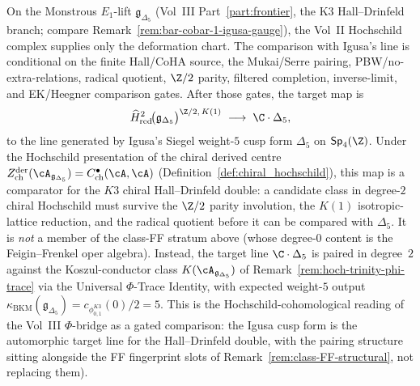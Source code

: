 \begin{remark}
\label{rem:hoch-igusa-gauge-class}
%
%
On the Monstrous $E_1$-lift
$\mathfrak{g}_{\Delta_5}$ (Vol~III Part~\ref{part:frontier},
the K3 Hall--Drinfeld branch; compare
Remark~\ref{rem:bar-cobar-1-igusa-gauge}), the Vol~II Hochschild
complex supplies only the deformation chart. The comparison with
Igusa's line is conditional on the finite Hall/CoHA source, the
Mukai/Serre pairing, PBW/no-extra-relations, radical quotient,
$\Z/2$ parity, filtered completion, inverse-limit, and EK/Heegner
comparison gates. After those gates, the target map is
\[
\widehat H^2_{\mathrm{red}}\!
  \bigl(\mathfrak{g}_{\Delta_5}\bigr)^{\Z/2,\,K(1)}
\;\longrightarrow\;
\C\cdot\Delta_5,
\]
to the line generated by Igusa's Siegel weight-$5$ cusp form
$\Delta_5$ on $\mathsf{Sp}_4(\Z)$. Under the Hochschild presentation
of the chiral derived centre
$Z^{\mathrm{der}}_{\mathrm{ch}}(\cA_{\mathfrak{g}_{\Delta_5}})
=C^\bullet_{\mathrm{ch}}(\cA,\cA)$
(Definition~\ref{def:chiral_hochschild}), this map is a comparator for
the $K3$ chiral Hall--Drinfeld double: a candidate class in
degree-$2$ chiral Hochschild must survive the $\Z/2$ parity involution,
the $K(1)$ isotropic-lattice reduction, and the radical quotient before
it can be compared with $\Delta_5$. It is \emph{not} a member of the
class-FF stratum above (whose degree-$0$ content is the
Feigin--Frenkel oper algebra). Instead, the target line
$\C\cdot\Delta_5$ is paired in degree~$2$ against the
Koszul-conductor class
$K(\cA_{\mathfrak{g}_{\Delta_5}})$ of
Remark~\ref{rem:hoch-trinity-phi-trace} via the Universal
$\Phi$-Trace Identity, with expected weight-$5$ output
$\kappa_{\mathrm{BKM}}(\mathfrak{g}_{\Delta_5})=c_{\phi_{0,1}^{K3}}(0)/2=5$.
This is the Hochschild-cohomological reading of the Vol~III
$\Phi$-bridge as a gated comparison: the Igusa cusp form is the
automorphic target line for the Hall--Drinfeld double, with the pairing
structure sitting alongside the FF fingerprint slots of
Remark~\ref{rem:class-FF-structural}, not replacing them).
\end{remark}

